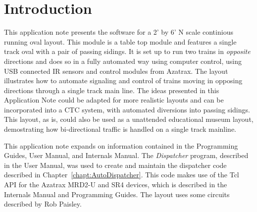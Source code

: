 
\chapter{Introduction}
\label{chapt:Introduction}

This application note presents the software for a 2' by 6' N scale
continious running oval layout.  This module is a table top module and
features a single track oval with a pair of passing sidings. It is set
up to run two trains in \textit{opposite} directions and does so in a
fully automated way using computer control, using USB connected IR
sensors and control modules from Azatrax.  The layout illustrates how
to automate signaling and control of trains moving in opposing
directions through a single track main line.  The ideas presented in
this Application Note could be adapted for more realistic layouts and
can be incorporated into a CTC system, with automated diversions into
passing sidings.  This layout, as is, could also be used as a
unattended educational museum layout, demostrating how bi-directional
traffic is handled on a single track mainline.

This application note expands on information contained in the
Programming Guides\cite{progguide}, User Manual\cite{userman}, and
Internals Manual\cite{internals}. The \textit{Dispatcher} program,
described in the User Manual, was used to create and maintain the
dispatcher code described in Chapter~\ref{chapt:AutoDispatcher}. This
code makes use of the Tcl API for the Azatrax MRD2-U and SR4 devices,
which is described in the Internals Manual and Programming Guides. The
layout uses some circuits described by Rob
Paisley\cite{MRRElectronicsRPAISLEY}. 

